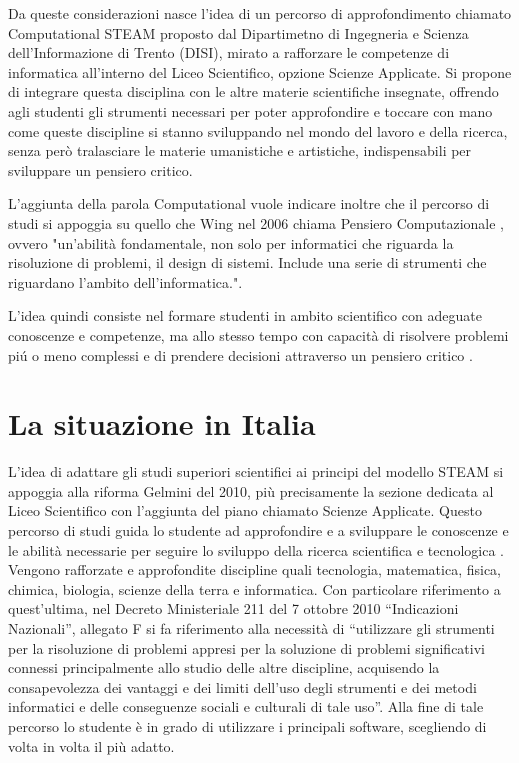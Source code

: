Da queste considerazioni nasce l’idea di un percorso di approfondimento chiamato Computational STEAM proposto dal Dipartimetno di Ingegneria e Scienza dell'Informazione di Trento (DISI), mirato a rafforzare le competenze di informatica all’interno del Liceo Scientifico, opzione Scienze Applicate. Si propone di integrare questa disciplina con le altre materie scientifiche insegnate, offrendo agli studenti gli strumenti necessari per poter approfondire e toccare con mano come queste discipline si stanno sviluppando nel mondo del lavoro e della ricerca, senza però tralasciare le materie umanistiche e artistiche, indispensabili per sviluppare un pensiero critico.

L'aggiunta della parola Computational vuole indicare inoltre che il percorso di studi si appoggia su quello che Wing nel 2006 chiama Pensiero Computazionale \cite{wing}, ovvero "un'abilità fondamentale, non solo per informatici che riguarda la risoluzione di problemi, il design di sistemi. Include una serie di strumenti che riguardano l'ambito dell'informatica.". 

L'idea quindi consiste nel formare studenti in ambito scientifico con adeguate conoscenze e competenze, ma allo stesso tempo con capacità di risolvere problemi piú o meno complessi e di prendere decisioni attraverso un pensiero critico \cite{ct_to_stem}.


\section{La situazione in Italia}
\label{sec:italia}
L’idea di adattare gli studi superiori scientifici ai principi del modello STEAM si appoggia alla riforma Gelmini del 2010, più precisamente la sezione dedicata al Liceo Scientifico con l’aggiunta del piano chiamato Scienze Applicate. Questo percorso di studi guida lo studente ad approfondire e a sviluppare le conoscenze e le abilità necessarie per seguire lo sviluppo della ricerca scientifica e tecnologica \cite{scienze_applicate}. Vengono rafforzate e approfondite discipline quali tecnologia, matematica, fisica, chimica, biologia, scienze della terra e informatica. Con particolare riferimento a quest’ultima, nel Decreto Ministeriale 211 del 7 ottobre 2010 “Indicazioni Nazionali”, allegato F \cite{riforma} si fa riferimento alla necessità di “utilizzare gli strumenti per la risoluzione di problemi appresi per la soluzione di problemi significativi connessi principalmente allo studio delle altre discipline, acquisendo la consapevolezza dei vantaggi e dei limiti dell’uso degli strumenti e dei metodi informatici e delle conseguenze sociali e culturali di tale uso”. Alla fine di tale percorso lo studente è in grado di utilizzare i principali software, scegliendo di volta in volta il più adatto.

